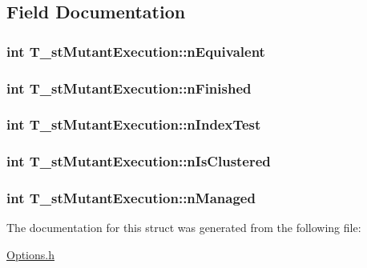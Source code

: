 \subsection{Field Documentation}
\hypertarget{structT__stMutantExecution_aad0159845c8a654cec6e68c0887be609}{
\subsubsection[{n\-Equivalent}]{\setlength{\rightskip}{0pt plus 5cm}int T\-\_\-st\-Mutant\-Execution\-::n\-Equivalent}}\label{structT__stMutantExecution_aad0159845c8a654cec6e68c0887be609}
\hypertarget{structT__stMutantExecution_a56ecf18ce5bc925a81abd45096ccc155}{
\subsubsection[{n\-Finished}]{\setlength{\rightskip}{0pt plus 5cm}int T\-\_\-st\-Mutant\-Execution\-::n\-Finished}}\label{structT__stMutantExecution_a56ecf18ce5bc925a81abd45096ccc155}
\hypertarget{structT__stMutantExecution_a8cbb62d7c67ff6a7c0e09ddd0f1e87ca}{
\subsubsection[{n\-Index\-Test}]{\setlength{\rightskip}{0pt plus 5cm}int T\-\_\-st\-Mutant\-Execution\-::n\-Index\-Test}}\label{structT__stMutantExecution_a8cbb62d7c67ff6a7c0e09ddd0f1e87ca}
\hypertarget{structT__stMutantExecution_a892cc030241593320f55fbabfa060679}{
\subsubsection[{n\-Is\-Clustered}]{\setlength{\rightskip}{0pt plus 5cm}int T\-\_\-st\-Mutant\-Execution\-::n\-Is\-Clustered}}\label{structT__stMutantExecution_a892cc030241593320f55fbabfa060679}
\hypertarget{structT__stMutantExecution_a3bd80a5e3e6c5cf647a62dfb0b694bcf}{
\subsubsection[{n\-Managed}]{\setlength{\rightskip}{0pt plus 5cm}int T\-\_\-st\-Mutant\-Execution\-::n\-Managed}}\label{structT__stMutantExecution_a3bd80a5e3e6c5cf647a62dfb0b694bcf}


The documentation for this struct was generated from the following file\-:\begin{DoxyCompactItemize}
\item 
\hyperlink{Options_8h}{Options.\-h}\end{DoxyCompactItemize}
